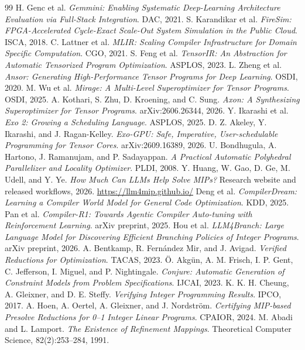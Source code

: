 \documentclass[11pt]{article}
\begin{document}
\begin{thebibliography}{99}
 H. Genc et al. \emph{Gemmini: Enabling Systematic Deep-Learning Architecture Evaluation via Full-Stack Integration}. DAC, 2021.
 S. Karandikar et al. \emph{FireSim: FPGA-Accelerated Cycle-Exact Scale-Out System Simulation in the Public Cloud}. ISCA, 2018.
 C. Lattner et al. \emph{MLIR: Scaling Compiler Infrastructure for Domain Specific Computation}. CGO, 2021.
 S. Feng et al. \emph{TensorIR: An Abstraction for Automatic Tensorized Program Optimization}. ASPLOS, 2023.
 L. Zheng et al. \emph{Ansor: Generating High-Performance Tensor Programs for Deep Learning}. OSDI, 2020.
 M. Wu et al. \emph{Mirage: A Multi-Level Superoptimizer for Tensor Programs}. OSDI, 2025.
 A. Kothari, S. Zhu, D. Kroening, and C. Sung. \emph{Axon: A Synthesizing Superoptimizer for Tensor Programs}. arXiv:2606.26344, 2026.
 Y. Ikarashi et al. \emph{Exo 2: Growing a Scheduling Language}. ASPLOS, 2025.
 D. Z. Akeley, Y. Ikarashi, and J. Ragan-Kelley. \emph{Exo-GPU: Safe, Imperative, User-schedulable Programming for Tensor Cores}. arXiv:2609.16389, 2026.
 U. Bondhugula, A. Hartono, J. Ramanujam, and P. Sadayappan. \emph{A Practical Automatic Polyhedral Parallelizer and Locality Optimizer}. PLDI, 2008.
 Y. Huang, W. Gao, D. Ge, M. Udell, and Y. Ye. \emph{How Much Can LLMs Help Solve MIPs?} Research website and released workflows, 2026. \url{https://llm4mip.github.io/}
 Deng et al. \emph{CompilerDream: Learning a Compiler World Model for General Code Optimization}. KDD, 2025.
 Pan et al. \emph{Compiler-R1: Towards Agentic Compiler Auto-tuning with Reinforcement Learning}. arXiv preprint, 2025.
 Hou et al. \emph{LLM4Branch: Large Language Model for Discovering Efficient Branching Policies of Integer Programs}. arXiv preprint, 2026.
 A. Bentkamp, R. Fernández Mir, and J. Avigad. \emph{Verified Reductions for Optimization}. TACAS, 2023.
 Ö. Akgün, A. M. Frisch, I. P. Gent, C. Jefferson, I. Miguel, and P. Nightingale. \emph{Conjure: Automatic Generation of Constraint Models from Problem Specifications}. IJCAI, 2023.
 K. K. H. Cheung, A. Gleixner, and D. E. Steffy. \emph{Verifying Integer Programming Results}. IPCO, 2017.
 A. Hoen, A. Oertel, A. Gleixner, and J. Nordström. \emph{Certifying MIP-based Presolve Reductions for 0--1 Integer Linear Programs}. CPAIOR, 2024.
 M. Abadi and L. Lamport. \emph{The Existence of Refinement Mappings}. Theoretical Computer Science, 82(2):253--284, 1991.

\end{thebibliography}
\end{document}
